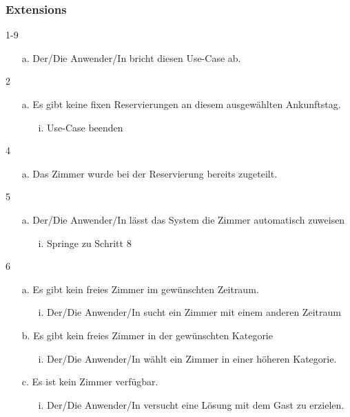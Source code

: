 \documentclass[./detailed_overview_usecases.tex]{subfiles}
\begin{document}
    \subsubsection*{Extensions}
    \item 1-9 \begin{itemize}
                   \item[a.] Der/Die Anwender/In bricht diesen Use-Case ab.
    \end{itemize}
    \item 2 \begin{itemize}
                \item[a.] Es gibt keine fixen Reservierungen an diesem ausgewählten Ankunftstag.
                \begin{itemize}
                    \item[i.] Use-Case beenden
                \end{itemize}
    \end{itemize}
    \item 4 \begin{itemize}
                \item[a.] Das Zimmer wurde bei der Reservierung bereits zugeteilt.
    \end{itemize}
    \item 5 \begin{itemize}
                \item[a.] Der/Die Anwender/In lässt das System die Zimmer automatisch zuweisen
                \begin{itemize}
                    \item[i.] Springe zu Schritt 8
                \end{itemize}
    \end{itemize}
    \item 6 \begin{itemize}
                \item[a.] Es gibt kein freies Zimmer im gewünschten Zeitraum.
                \begin{itemize}
                    \item[i.] Der/Die Anwender/In sucht ein Zimmer mit einem anderen Zeitraum
                \end{itemize}
                \item[b.] Es gibt kein freies Zimmer in der gewünschten Kategorie
                \begin{itemize}
                    \item[i.] Der/Die Anwender/In wählt ein Zimmer in einer höheren Kategorie.
                \end{itemize}
                \item[c.] Es ist kein Zimmer verfügbar.
                \begin{itemize}
                    \item[i.] Der/Die Anwender/In versucht eine Lösung mit dem Gast zu erzielen.
                \end{itemize}
    \end{itemize}
\end{document}
